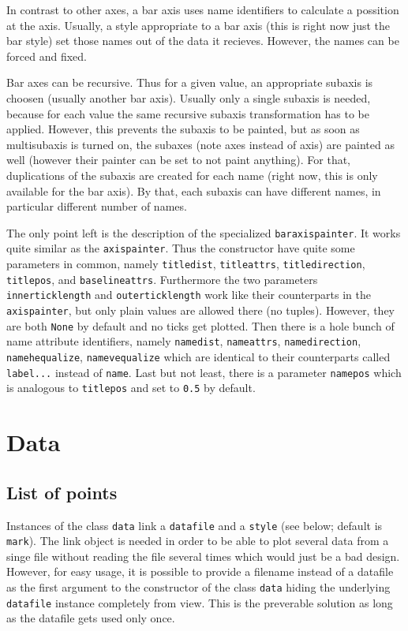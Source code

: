 In contrast to other axes, a bar axis uses name identifiers to
calculate a possition at the axis. Usually, a style appropriate to a
bar axis (this is right now just the bar style) set those names out of
the data it recieves. However, the names can be forced and fixed.

Bar axes can be recursive. Thus for a given value, an appropriate
subaxis is choosen (usually another bar axis). Usually only a single
subaxis is needed, because for each value the same recursive subaxis
transformation has to be applied. However, this prevents the subaxis
to be painted, but as soon as multisubaxis is turned on, the subaxes
(note axes instead of axis) are painted as well (however their painter
can be set to not paint anything). For that, duplications of the
subaxis are created for each name (right now, this is only available
for the bar axis). By that, each subaxis can have different names, in
particular different number of names.

The only point left is the description of the specialized
\verb|baraxispainter|. It works quite similar as the
\verb|axispainter|. Thus the constructor have quite some parameters in
common, namely \verb|titledist|, \verb|titleattrs|,
\verb|titledirection|, \verb|titlepos|, and \verb|baselineattrs|.
Furthermore the two parameters \verb|innerticklength| and
\verb|outerticklength| work like their counterparts in the
\verb|axispainter|, but only plain values are allowed there (no
tuples). However, they are both \verb|None| by default and no ticks
get plotted. Then there is a hole bunch of name
attribute identifiers, namely \verb|namedist|, \verb|nameattrs|,
\verb|namedirection|, \verb|namehequalize|, \verb|namevequalize| which
are identical to their counterparts called \verb|label...| instead of
\verb|name|. Last but not least, there is a parameter \verb|namepos|
which is analogous to \verb|titlepos| and set to \verb|0.5| by
default.

\section{Data}
\label{graph:data}

\subsection{List of points}

Instances of the class \verb|data| link a \verb|datafile| and a
\verb|style| (see below; default is \verb|mark|). The link object is
needed in order to be able to plot several data from a singe file
without reading the file several times which would just be a bad
design. However, for easy usage, it is possible to provide a filename
instead of a datafile as the first argument to the constructor of the
class \verb|data| hiding the underlying \verb|datafile| instance
completely from view. This is the preverable solution as long as the
datafile gets used only once.

